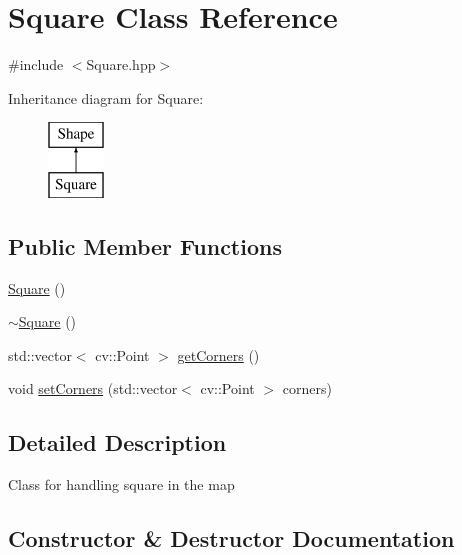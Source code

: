 \hypertarget{class_square}{}\section{Square Class Reference}
\label{class_square}


{\ttfamily \#include $<$Square.\+hpp$>$}

Inheritance diagram for Square\+:\begin{figure}[H]
\begin{center}
\leavevmode
\includegraphics[height=2.000000cm]{class_square}
\end{center}
\end{figure}
\subsection*{Public Member Functions}
\begin{DoxyCompactItemize}
\item 
\mbox{\hyperlink{class_square_a3dc7ff9aefc2725172b5d3153973d243}{Square}} ()
\item 
\mbox{\hyperlink{class_square_a90af7ce1060cff7b717ceddb333846b8}{$\sim$\+Square}} ()
\item 
std\+::vector$<$ cv\+::\+Point $>$ \mbox{\hyperlink{class_square_a53b1e1223e97676db711dd75f2daa508}{get\+Corners}} ()
\item 
void \mbox{\hyperlink{class_square_a84c4995b49318b5191a4fe3739e4f081}{set\+Corners}} (std\+::vector$<$ cv\+::\+Point $>$ corners)
\end{DoxyCompactItemize}


\subsection{Detailed Description}
Class for handling square in the map 

\subsection{Constructor \& Destructor Documentation}
\mbox{\label{class_square_a3dc7ff9aefc2725172b5d3153973d243}} 
